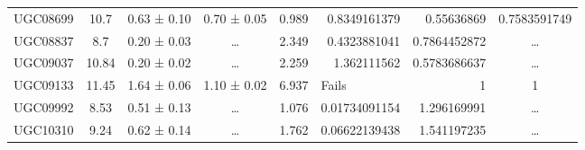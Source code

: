 \documentclass[reprint,%
 amsmath,amssymb,
 aps,
]{revtex4-1}
\begin{document}
\begin{table}[]
\begin{tabular}{cccccrrc}
\rowcolor[HTML]{F3F3F3} 
UGC08699             & 10.7                      & 0.63 ± 0.10           & 0.70 ± 0.05            & 0.989                                                        & 0.8349161379                                                          & 0.55636869                                                            & \multicolumn{1}{r}{\cellcolor[HTML]{F3F3F3}0.7583591749}      \\
\rowcolor[HTML]{F3F3F3} 
UGC08837             & 8.7                       & 0.20 ± 0.03           & …                      & 2.349                                                        & 0.4323881041                                                          & 0.7864452872                                                          & …                                                             \\
\rowcolor[HTML]{F3F3F3} 
UGC09037             & 10.84                     & 0.20 ± 0.02           & …                      & 2.259                                                        & 1.362111562                                                           & 0.5783686637                                                          & …                                                             \\
\rowcolor[HTML]{F3F3F3} 
UGC09133             & 11.45                     & 1.64 ± 0.06           & 1.10 ± 0.02            & 6.937                                                        & \multicolumn{1}{l}{\cellcolor[HTML]{F3F3F3}Fails}                     & 1                                                                     & 1                                                             \\
\rowcolor[HTML]{F3F3F3} 
UGC09992             & 8.53                      & 0.51 ± 0.13           & …                      & 1.076                                                        & 0.01734091154                                                         & 1.296169991                                                           & …                                                             \\
\rowcolor[HTML]{F3F3F3} 
UGC10310             & 9.24                      & 0.62 ± 0.14           & …                      & 1.762                                                        & 0.06622139438                                                         & 1.541197235                                                           & …                                                             \\

\end{tabular}
\end{table}
\end{document}
